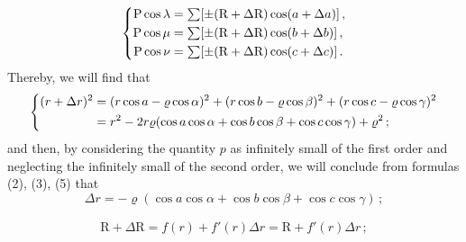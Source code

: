 \documentclass[leqno,openright,smallroyalvopaper,8pt,twoside,showtrims]{memoir}
\begin{document}
\begin{equation}
\begin{dcases}
\begin{aligned}
\text{P}\cos\lambda&=\textstyle\sum[\pm (\text{R}+\Delta\text{R})\cos(a+\Delta a)]\,,\\
\text{P}\cos\mu&=\textstyle\sum[\pm (\text{R}+\Delta\text{R})\cos(b+\Delta b)]\,,\\
\text{P}\cos\nu&=\textstyle\sum[\pm (\text{R}+\Delta\text{R})\cos(c+\Delta c)]\,.
\end{aligned}
\end{dcases}
\end{equation}
Thereby, we will find that
\begin{equation}
\begin{dcases}
\begin{aligned}
(r+\Delta r)^2&=(r\cos a-\varrho\cos\alpha)^2+(r\cos b-\varrho\cos\beta)^2+(r\cos c-\varrho\cos\gamma)^2\\
&=r^2-2r\varrho(\cos a\cos\alpha+\cos b\cos\beta+\cos c\cos\gamma)+\varrho^2\,;
\end{aligned}
\end{dcases}
\end{equation}
and then, by considering the quantity $p$ as infinitely small of the first order and neglecting the infinitely small of the second order, we will conclude from formulas (2), (3), (5) that
\begin{equation}
\Delta r = - \varrho (\cos a\cos\alpha+\cos b\cos\beta+\cos c\cos\gamma)\,;
\end{equation}

\begin{align}
\text{R}+\Delta \text{R} = f(r) + f'(r)\Delta r = \text{R} + f'(r)\Delta r\,;
\end{align}
\end{document}
